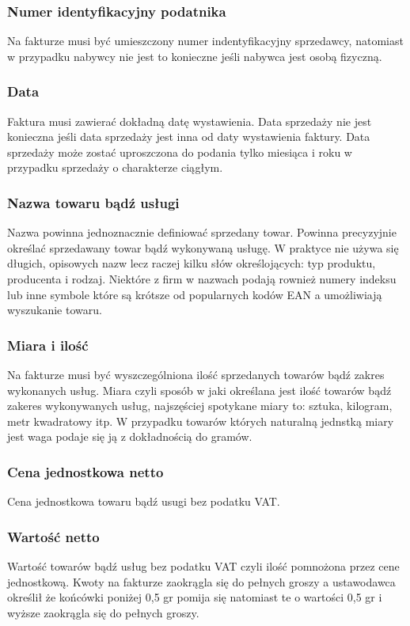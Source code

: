 \documentclass[12pt, a4paper]{article}
\begin{document}
\subsubsection{Numer identyfikacyjny podatnika}
Na fakturze musi być umieszczony numer indentyfikacyjny sprzedawcy, natomiast w
przypadku nabywcy nie jest to konieczne jeśli nabywca jest osobą fizyczną.
\subsubsection{Data}
Faktura musi zawierać dokładną datę wystawienia. Data sprzedaży nie jest
konieczna jeśli data sprzedaży jest inna od daty wystawienia faktury. Data
sprzedaży może zostać uproszczona do podania tylko miesiąca i roku w przypadku
sprzedaży o charakterze ciągłym.
\subsubsection{Nazwa towaru bądź usługi}
Nazwa powinna jednoznacznie definiować sprzedany towar. Powinna precyzyjnie
określać sprzedawany towar bądź wykonywaną usługę. W praktyce nie używa się
długich, opisowych nazw lecz raczej kilku słów określojących: typ produktu,
producenta i rodzaj. Niektóre z firm w nazwach podają rownież numery indeksu lub
inne symbole które są krótsze od popularnych kodów EAN a umożliwiają wyszukanie
towaru.
\subsubsection{Miara i ilość}
Na fakturze musi być wyszczególniona ilość sprzedanych towarów bądź zakres
wykonanych usług. Miara czyli sposób w jaki określana jest ilość towarów bądź
zakeres wykonywanych usług, najszęściej spotykane miary to: sztuka, kilogram,
metr kwadratowy itp. W przypadku towarów których naturalną jednstką miary jest
waga podaje się ją z dokładnością do gramów.
\subsubsection{Cena jednostkowa netto}
Cena jednostkowa towaru bądź usugi bez podatku VAT.
\subsubsection{Wartość netto}
Wartość towarów bądź usług bez podatku VAT czyli ilość pomnożona przez cene
jednostkową. Kwoty na fakturze zaokrągla się do pełnych groszy a ustawodawca
określił że końcówki poniżej 0,5 gr pomija się natomiast te o wartości 0,5 gr i
wyższe zaokrągla się do pełnych groszy.
\end{document}
